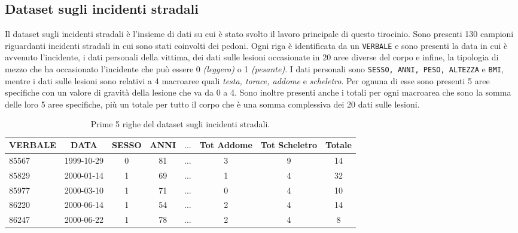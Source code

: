 \documentclass[12pt, twoside, letterpaper]{report}
\begin{document}
			
		\subsection{Dataset sugli incidenti stradali} \label{sec:incidenti}
			Il dataset sugli incidenti stradali è l'insieme di dati su cui è stato svolto il lavoro principale di questo tirocinio. Sono presenti 130 campioni riguardanti incidenti stradali in cui sono stati coinvolti dei pedoni. Ogni riga è identificata da un \texttt{VERBALE} e sono presenti la data in cui è avvenuto l'incidente, i dati personali della vittima, dei dati sulle lesioni occasionate in 20 aree diverse del corpo e infine, la tipologia di mezzo che ha occasionato l'incidente che può essere 0 \textit{(leggero)} o 1 \textit{(pesante)}. I dati personali sono \texttt{SESSO, ANNI, PESO, ALTEZZA} e \texttt{BMI}, mentre i dati sulle lesioni sono relativi a 4 macroaree quali \textit{testa, torace, addome} e \textit{scheletro}. Per ognuna di esse sono presenti 5 aree specifiche con un valore di gravità della lesione che va da 0 a 4. Sono inoltre presenti anche i totali per ogni macroarea che sono la somma delle loro 5 aree specifiche, più un totale per tutto il corpo che è una somma complessiva dei 20 dati sulle lesioni. 
			\begin{table}[h]
			\begin{tabular}{lccccccc}
			\toprule
			VERBALE & DATA &  SESSO &  ANNI & $\dots$ &  Tot Addome &  Tot Scheletro &  Totale \\
			\midrule
			85567 & 1999-10-29 &      0 &    81 &  $\dots$ &         3 &              9 &      14 \\
			85829 & 2000-01-14 &      1 &    69 &  $\dots$ &         1 &              4 &      32 \\
			85977 & 2000-03-10 &      1 &    71 &  $\dots$ &         0 &              4 &      10 \\
			86220 & 2000-06-14 &      1 &    54 &  $\dots$ &         2 &              4 &      14 \\
			86247 & 2000-06-22 &      1 &    78 &  $\dots$ &         2 &              4 &       8 \\
			\bottomrule
			\end{tabular}
			\caption{\label{tab:incidenti}Prime 5 righe del dataset sugli incidenti stradali.}
			\end{table}
			
\end{document}
